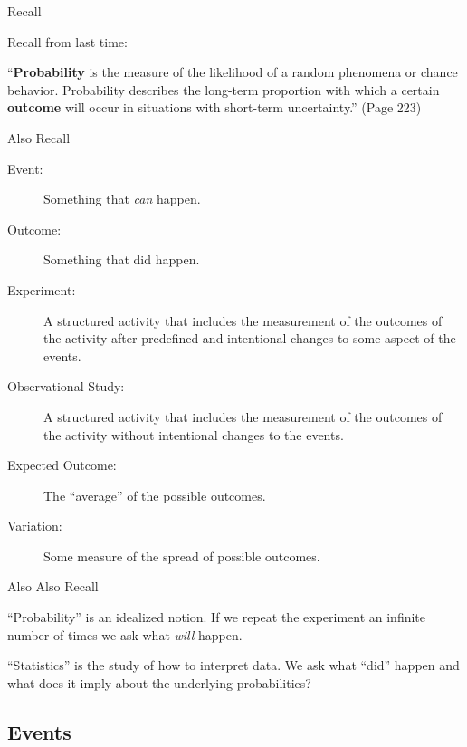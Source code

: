 \begin{frame}{Recall}

  Recall from last time:

  \begin{definition}[Probability]
    ``\textbf{Probability} is the measure of the likelihood of a random
    phenomena or chance behavior. Probability describes the long-term
    proportion with which a certain \textbf{outcome} will occur in
    situations with short-term uncertainty.'' (Page 223)
  \end{definition}

  
\end{frame}


\begin{frame}{Also Recall}

  \begin{description}
  \item[Event:] Something that \textit{can} happen.
  \item[Outcome:] Something that did happen.
  \item[Experiment:] A structured activity that includes the
    measurement of the outcomes of the activity after predefined and
    intentional changes to some aspect of the events.
  \item[Observational Study:] A structured activity that includes the
    measurement of the outcomes of the activity without intentional
    changes to the events.
  \item[Expected Outcome:] The ``average'' of the possible outcomes.
  \item[Variation:] Some measure of the spread of possible outcomes.
  \end{description}
  
\end{frame}

\begin{frame}{Also Also Recall}

  ``Probability'' is an idealized notion. If we repeat the experiment
  an infinite number of times we ask what \textit{will} happen.

  \vfill

  ``Statistics'' is the study of how to interpret data. We ask what
  ``did'' happen and what does it imply about the underlying
  probabilities?

  \vfill

\end{frame}


\subsection{Events}

